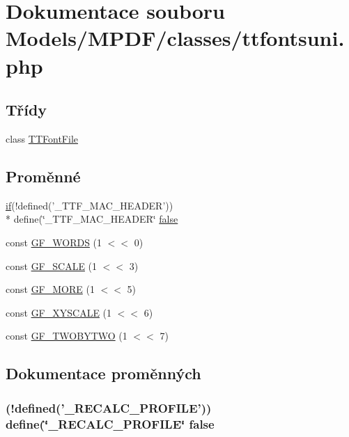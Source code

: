 \hypertarget{ttfontsuni_8php}{\section{Dokumentace souboru Models/\-M\-P\-D\-F/classes/ttfontsuni.php}
\label{ttfontsuni_8php}
}
\subsection*{Třídy}
\begin{DoxyCompactItemize}
\item 
class \hyperlink{class_t_t_font_file}{T\-T\-Font\-File}
\end{DoxyCompactItemize}
\subsection*{Proměnné}
\begin{DoxyCompactItemize}
\item 
\hyperlink{pdf__parser_8php_af8105e84b42a9ceda5357caeb6c4760b}{if}(!defined('\-\_\-\-T\-T\-F\-\_\-\-M\-A\-C\-\_\-\-H\-E\-A\-D\-E\-R')) \\*
define(\char`\"{}\-\_\-\-T\-T\-F\-\_\-\-M\-A\-C\-\_\-\-H\-E\-A\-D\-E\-R\char`\"{} \hyperlink{ttfontsuni_8php_afbaa04e5cc97693dc668b3c45d3dd740}{false}
\item 
const \hyperlink{ttfontsuni_8php_aae20fb5dea4be83872819907d66f0e93}{G\-F\-\_\-\-W\-O\-R\-D\-S} (1 $<$$<$ 0)
\item 
const \hyperlink{ttfontsuni_8php_a84b402e5b87bb7783e7d04742255b6ad}{G\-F\-\_\-\-S\-C\-A\-L\-E} (1 $<$$<$ 3)
\item 
const \hyperlink{ttfontsuni_8php_ae1c1813b91e59b66297774d8dba04ea9}{G\-F\-\_\-\-M\-O\-R\-E} (1 $<$$<$ 5)
\item 
const \hyperlink{ttfontsuni_8php_a6473563f89e8745ec18dc7b071ec35dd}{G\-F\-\_\-\-X\-Y\-S\-C\-A\-L\-E} (1 $<$$<$ 6)
\item 
const \hyperlink{ttfontsuni_8php_a1d0d42be48bb8bdf9063333ba18fc169}{G\-F\-\_\-\-T\-W\-O\-B\-Y\-T\-W\-O} (1 $<$$<$ 7)
\end{DoxyCompactItemize}


\subsection{Dokumentace proměnných}
\hypertarget{ttfontsuni_8php_afbaa04e5cc97693dc668b3c45d3dd740}{
\subsubsection[{false}]{ (!defined('\-\_\-\-R\-E\-C\-A\-L\-C\-\_\-\-P\-R\-O\-F\-I\-L\-E')) define(\char`\"{}\-\_\-\-R\-E\-C\-A\-L\-C\-\_\-\-P\-R\-O\-F\-I\-L\-E\char`\"{} false}}\label{ttfontsuni_8php_afbaa04e5cc97693dc668b3c45d3dd740}


